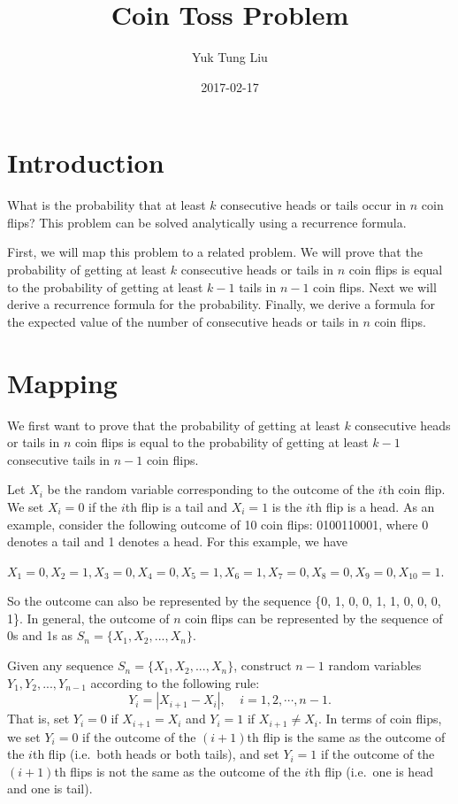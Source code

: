 \documentclass[11pt]{article}
\newcommand{\beq}{\begin{equation}}
\newcommand{\eeq}{\end{equation}}
\begin{document}
\title{Coin Toss Problem}
\author{Yuk Tung Liu}
\date{2017-02-17}
\maketitle

\bigskip
\section{Introduction}

What is the probability that at least $k$ consecutive heads or tails occur in 
$n$ coin flips? This problem can be solved analytically using a recurrence formula. 

First, we will map this problem to a related problem. We will prove that the 
probability of getting at least $k$ consecutive heads or tails in $n$ coin flips 
is equal to the probability of getting at least $k-1$ tails in $n-1$ coin flips. 
Next we will derive a recurrence formula for the probability. Finally, we 
derive a formula for the expected value of the number of consecutive heads or tails 
in $n$ coin flips.

\section{Mapping} 

We first want to prove that the probability of getting at least $k$ consecutive 
heads or tails in $n$ coin flips is equal to the probability of getting at least $k-1$ 
consecutive tails in $n-1$ coin flips.

Let $X_i$ be the random variable corresponding to the outcome of the $i$th coin flip. We set 
$X_i=0$ if the $i$th flip is a tail and $X_i=1$ is the $i$th flip is a head. 
As an example, consider the following outcome of 10 coin flips: 
0100110001, where 0 denotes a tail and 1 denotes a head. For this example, we have 

$X_1=0, X_2=1, X_3=0, X_4=0, X_5=1, X_6=1, X_7=0, X_8=0, X_9=0,  X_{10}=1$. 

So the outcome can also be represented by the sequence \{0, 1, 0, 0, 1, 1, 0, 0, 0, 1\}. In 
general, the outcome of $n$ coin flips can be represented by the sequence of 0s and 1s 
as $S_n=\{X_1, X_2, ..., X_n\}$. 

Given any sequence $S_n=\{X_1, X_2, ..., X_n\}$, construct $n-1$ random variables $Y_1,Y_2,...,Y_{n-1}$ 
according to the following rule: 
\beq
  Y_i = |X_{i+1}-X_i| , \ \ \ \ \ i=1,2,\cdots ,n-1.
\label{def:Y}
\eeq
That is, set $Y_i=0$ if $X_{i+1}=X_i$ and $Y_i=1$ if $X_{i+1} \neq X_i$. In terms of coin flips, 
we set $Y_i=0$ if the outcome of the $(i+1)$th flip is the same as the outcome of the $i$th flip (i.e.\  
both heads or both tails), and set $Y_i=1$ if the outcome of the $(i+1)$th flips is not 
the same as the outcome of the $i$th flip (i.e.\ one is head and one is tail). 
\end{document}

